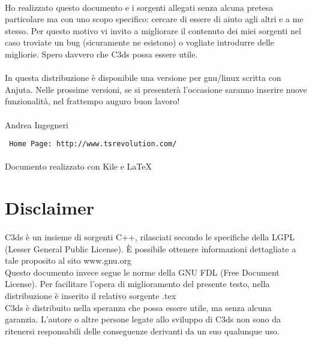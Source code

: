\documentclass[11pt,a4paper]{article}
\begin{document}
\paragraph*{}
Ho realizzato questo documento e i sorgenti allegati senza alcuna pretesa particolare ma con uno scopo specifico: cercare di essere di aiuto agli altri e a me stesso. Per questo motivo vi invito a migliorare il contenuto dei miei sorgenti nel caso troviate un bug (sicuramente ne esistono) o vogliate introdurre delle migliorie. Spero davvero che C3ds possa essere utile.

\paragraph*{}
In questa distribuzione \`e disponibile una versione per gnu/linux scritta con Anjuta.
Nelle prossime versioni, se si presenter\`a l'occasione saranno inserire nuove funzionalit\`a, nel frattempo auguro buon lavoro!

\paragraph*{}
Andrea Ingegneri\\
\begin{verbatim}
 Home Page: http://www.tsrevolution.com/
\end{verbatim}

\paragraph*{}
\begin{small}
Documento realizzato con Kile e \LaTeX
\end{small}

\section*{Disclaimer}

\paragraph*{}
C3ds \`e un insieme di sorgenti C++, rilasciati secondo le specifiche della LGPL (Lesser General Public License). \`E possibile ottenere informazioni dettagliate a tale proposito al sito www.gnu.org\\
Questo documento invece segue le norme della GNU FDL (Free Document License). Per facilitare l'opera di miglioramento del presente testo, nella distribuzione \`e inserito il relativo sorgente .tex\\
C3ds \`e distribuito nella speranza che possa essere utile, ma senza alcuna garanzia. L'autore o altre persone legate allo sviluppo di C3ds non sono da ritenersi responsabili delle conseguenze derivanti da un suo qualunque uso.
\end{document}
